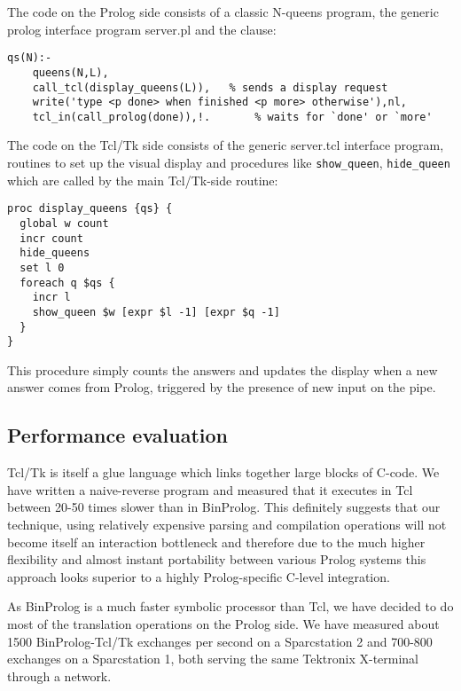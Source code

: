 \documentclass{article}
\begin{document}
The code on the Prolog side consists of a
classic N-queens program, the generic
prolog interface program server.pl
and the clause:

{\small \begin{verbatim}
qs(N):-
    queens(N,L),
    call_tcl(display_queens(L)),   % sends a display request
    write('type <p done> when finished <p more> otherwise'),nl,
    tcl_in(call_prolog(done)),!.       % waits for `done' or `more'
\end{verbatim}}

{\flushleft The} code on the Tcl/Tk side
consists of the generic server.tcl interface program,
routines to set up the visual display and procedures like
\verb~show_queen~, \verb~hide_queen~ which are called by the
main Tcl/Tk-side routine:

{\small \begin{verbatim}
proc display_queens {qs} {
  global w count
  incr count
  hide_queens
  set l 0
  foreach q $qs {
    incr l
    show_queen $w [expr $l -1] [expr $q -1]    
  }  
}
\end{verbatim}}

{\flushleft This} procedure simply counts the answers and updates the display
when a new answer comes from Prolog, triggered by the presence
of new input on the pipe.


\subsection{Performance evaluation}

Tcl/Tk is itself a glue language which links together
large blocks of C-code.
We have written a naive-reverse program
and measured that it executes in Tcl between
20-50 times slower than in BinProlog.
This definitely suggests that our technique, using
relatively expensive parsing and compilation operations
will not become itself an interaction bottleneck and
therefore due to the much
higher flexibility and almost instant
portability between various Prolog systems
this approach looks superior to a highly
Prolog-specific C-level integration.

As BinProlog is a much faster symbolic processor than Tcl,
we have
decided to do most of the translation
operations on the Prolog side.
We have measured about 1500 BinProlog-Tcl/Tk exchanges per second
on a Sparcstation 2 and 700-800 exchanges on a Sparcstation 1,
both serving the same Tektronix X-terminal through a network.
\end{document}
